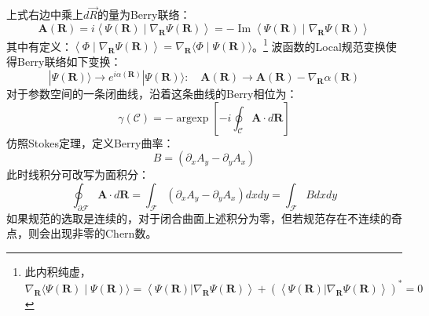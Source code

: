 \documentclass[12pt, a4paper, oneside]{ctexbook}
\begin{document}
	上式右边中乘上$ d\vec{R} $的量为Berry联络：
	\begin{equation}
		\mathbf{A}(\mathbf{R})=i\left\langle\Psi(\mathbf{R}) \mid \nabla_{\mathbf{R}} \Psi(\mathbf{R})\right\rangle=-\operatorname{Im}\left\langle\Psi(\mathbf{R}) \mid \nabla_{\mathbf{R}} \Psi(\mathbf{R})\right\rangle
	\end{equation} 
	其中有定义：$ \left\langle\Phi \mid \nabla_{\mathbf{R}} \Psi(\mathbf{R})\right\rangle=\nabla_{\mathbf{R}}\langle\Phi \mid \Psi(\mathbf{R})\rangle $。\footnote{此内积纯虚，$ \nabla_{\mathbf{R}}\langle\Psi(\mathbf{R}) \mid \Psi(\mathbf{R})\rangle=\left\langle\Psi(\mathbf{R})|\nabla_{\mathbf{R}} \Psi(\mathbf{R})\right\rangle+(\left\langle\Psi(\mathbf{R})|\nabla_{\mathbf{R}} \Psi(\mathbf{R})\right\rangle)^*=0 $ }
	波函数的Local规范变换使得Berry联络如下变换：
	\begin{equation}
		|\Psi(\mathbf{R})\rangle \rightarrow e^{i \alpha(\mathbf{R})}|\Psi(\mathbf{R})\rangle: \quad \mathbf{A}(\mathbf{R}) \rightarrow \mathbf{A}(\mathbf{R})-\nabla_{\mathbf{R}} \alpha(\mathbf{R})
	\end{equation} 
	对于参数空间的一条闭曲线，沿着这条曲线的Berry相位为：
	\begin{equation}
		\gamma(\mathscr{C})=-\operatorname{argexp}\left[-i \oint_{\mathscr{C}} \mathbf{A} \cdot d \mathbf{R}\right]
	\end{equation}
	仿照Stokes定理，定义Berry曲率：
	\begin{equation}
		B=\left(\partial_x A_y-\partial_y A_x\right)
	\end{equation}
	此时线积分可改写为面积分：
	\begin{equation}
		\oint_{\partial \mathscr{F}} \mathbf{A} \cdot d \mathbf{R}=\int_{\mathscr{F}}\left(\partial_x A_y-\partial_y A_x\right) d x d y=\int_{\mathscr{F}} B d x d y
	\end{equation}
	如果规范的选取是连续的，对于闭合曲面上述积分为零，但若规范存在不连续的奇点，则会出现非零的Chern数。
	
	
\end{document}
